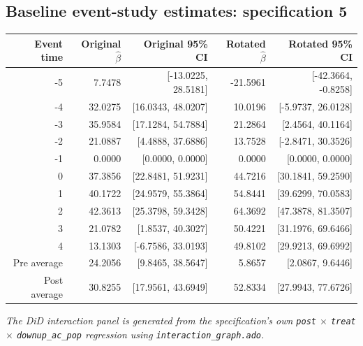 \documentclass[10pt]{article}
\begin{document}
\subsection*{Baseline event-study estimates: specification 5}
\begin{center}
\scriptsize
\begin{tabular}{r rr rr}
\toprule
Event time & Original $\hat\beta$ & Original 95\% CI & Rotated $\hat\beta$ & Rotated 95\% CI \\
\midrule
-5 & 7.7478 & [-13.0225, 28.5181] & -21.5961 & [-42.3664, -0.8258] \\
-4 & 32.0275 & [16.0343, 48.0207] & 10.0196 & [-5.9737, 26.0128] \\
-3 & 35.9584 & [17.1284, 54.7884] & 21.2864 & [2.4564, 40.1164] \\
-2 & 21.0887 & [4.4888, 37.6886] & 13.7528 & [-2.8471, 30.3526] \\
-1 & 0.0000 & [0.0000, 0.0000] & 0.0000 & [0.0000, 0.0000] \\
0 & 37.3856 & [22.8481, 51.9231] & 44.7216 & [30.1841, 59.2590] \\
1 & 40.1722 & [24.9579, 55.3864] & 54.8441 & [39.6299, 70.0583] \\
2 & 42.3613 & [25.3798, 59.3428] & 64.3692 & [47.3878, 81.3507] \\
3 & 21.0782 & [1.8537, 40.3027] & 50.4221 & [31.1976, 69.6466] \\
4 & 13.1303 & [-6.7586, 33.0193] & 49.8102 & [29.9213, 69.6992] \\
\midrule
Pre average & 24.2056 & [9.8465, 38.5647] & 5.8657 & [2.0867, 9.6446] \\
Post average & 30.8255 & [17.9561, 43.6949] & 52.8334 & [27.9943, 77.6726] \\
\bottomrule
\end{tabular}
\end{center}
\medskip
\textit{The DiD interaction panel is generated from the specification's own \texttt{post} $\times$ \texttt{treat} $\times$ \texttt{downup\_ac\_pop} regression using \texttt{interaction\_graph.ado}.}
\clearpage
\end{document}
